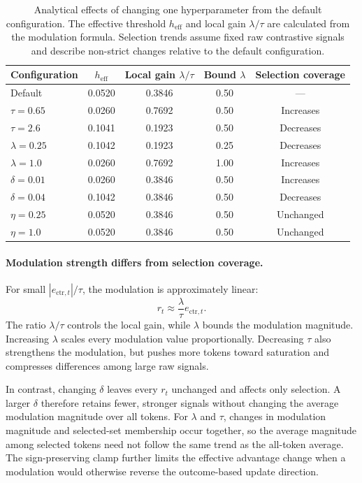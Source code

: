 \begin{table}[t]
\centering
\caption{Analytical effects of changing one hyperparameter from the default configuration. The effective threshold $h_{\mathrm{eff}}$ and local gain $\lambda/\tau$ are calculated from the modulation formula. Selection trends assume fixed raw contrastive signals and describe non-strict changes relative to the default configuration.}
\label{tab:hyperparameter-mechanism}
\small
\setlength{\tabcolsep}{7pt}
\begin{tabular}{lcccc}
\toprule
Configuration
& $h_{\mathrm{eff}}$
& Local gain $\lambda/\tau$
& Bound $\lambda$
& Selection coverage \\
\midrule
Default          & 0.0520 & 0.3846 & 0.50 & --- \\
\midrule
$\tau=0.65$      & 0.0260 & 0.7692 & 0.50 & Increases \\
$\tau=2.6$       & 0.1041 & 0.1923 & 0.50 & Decreases \\
\midrule
$\lambda=0.25$   & 0.1042 & 0.1923 & 0.25 & Decreases \\
$\lambda=1.0$    & 0.0260 & 0.7692 & 1.00 & Increases \\
\midrule
$\delta=0.01$    & 0.0260 & 0.3846 & 0.50 & Increases \\
$\delta=0.04$    & 0.1042 & 0.3846 & 0.50 & Decreases \\
\midrule
$\eta=0.25$      & 0.0520 & 0.3846 & 0.50 & Unchanged \\
$\eta=1.0$       & 0.0520 & 0.3846 & 0.50 & Unchanged \\
\bottomrule
\end{tabular}
\end{table}

\paragraph{Modulation strength differs from selection coverage.}
For small $|e_{\mathrm{ctr},t}|/\tau$, the modulation is approximately linear:
\begin{equation}
r_t\approx\frac{\lambda}{\tau}e_{\mathrm{ctr},t}.
\end{equation}
The ratio $\lambda/\tau$ controls the local gain, while $\lambda$ bounds the modulation magnitude. Increasing $\lambda$ scales every modulation value proportionally. Decreasing $\tau$ also strengthens the modulation, but pushes more tokens toward saturation and compresses differences among large raw signals.

In contrast, changing $\delta$ leaves every $r_t$ unchanged and affects only selection. A larger $\delta$ therefore retains fewer, stronger signals without changing the average modulation magnitude over all tokens. For $\lambda$ and $\tau$, changes in modulation magnitude and selected-set membership occur together, so the average magnitude among selected tokens need not follow the same trend as the all-token average. The sign-preserving clamp further limits the effective advantage change when a modulation would otherwise reverse the outcome-based update direction.

